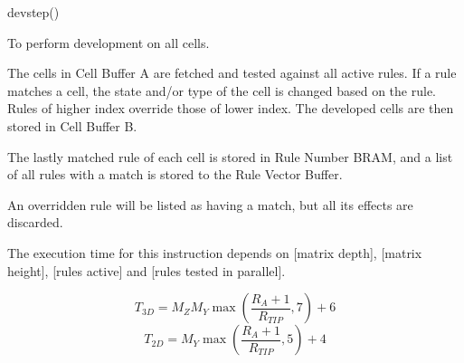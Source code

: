 

\format

devstep()

\purpose

To perform development on all cells.

\description

The cells in Cell Buffer A are fetched and tested against all active rules.
If a rule matches a cell, the state and/or type of the cell is changed based on the rule.
Rules of higher index override those of lower index.
The developed cells are then stored in Cell Buffer B.

The lastly matched rule of each cell is stored in Rule Number BRAM, and a list of all rules with a match is stored to the Rule Vector Buffer.

\notes

An overridden rule will be listed as having a match, but all its effects are discarded.

The execution time for this instruction depends on [matrix depth], [matrix height], [rules active] and [rules tested in parallel].

$$ T_{3D} = M_Z M_Y \max \left( \frac{ R_A + 1 }{ R_{TIP} }, 7 \right) + 6 $$
$$ T_{2D} = M_Y \max \left( \frac{ R_A + 1 }{ R_{TIP} }, 5 \right) + 4 $$
